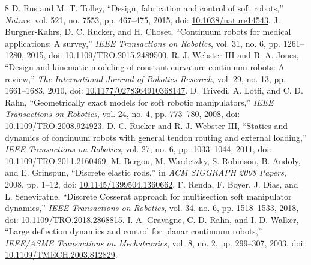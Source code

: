 \documentclass[letterpaper,10pt,conference]{ieeeconf}
\begin{document}
\clearpage
\begin{thebibliography}{8}
D. Rus and M. T. Tolley, ``Design, fabrication and control of soft robots,''
\emph{Nature}, vol. 521, no. 7553, pp. 467--475, 2015,
doi: \href{https://doi.org/10.1038/nature14543}{10.1038/nature14543}.
J. Burgner-Kahrs, D. C. Rucker, and H. Choset,
``Continuum robots for medical applications: A survey,''
\emph{IEEE Transactions on Robotics}, vol. 31, no. 6,
pp. 1261--1280, 2015,
doi: \href{https://doi.org/10.1109/TRO.2015.2489500}{10.1109/TRO.2015.2489500}.
R. J. Webster III and B. A. Jones,
``Design and kinematic modeling of constant curvature continuum robots:
A review,'' \emph{The International Journal of Robotics Research},
vol. 29, no. 13, pp. 1661--1683, 2010,
doi: \href{https://doi.org/10.1177/0278364910368147}{10.1177/0278364910368147}.
D. Trivedi, A. Lotfi, and C. D. Rahn,
``Geometrically exact models for soft robotic manipulators,''
\emph{IEEE Transactions on Robotics}, vol. 24, no. 4,
pp. 773--780, 2008,
doi: \href{https://doi.org/10.1109/TRO.2008.924923}{10.1109/TRO.2008.924923}.
D. C. Rucker and R. J. Webster III,
``Statics and dynamics of continuum robots with general tendon routing
and external loading,'' \emph{IEEE Transactions on Robotics},
vol. 27, no. 6, pp. 1033--1044, 2011,
doi: \href{https://doi.org/10.1109/TRO.2011.2160469}{10.1109/TRO.2011.2160469}.
M. Bergou, M. Wardetzky, S. Robinson, B. Audoly, and E. Grinspun,
``Discrete elastic rods,'' in \emph{ACM SIGGRAPH 2008 Papers},
2008, pp. 1--12,
doi: \href{https://doi.org/10.1145/1399504.1360662}{10.1145/1399504.1360662}.
F. Renda, F. Boyer, J. Dias, and L. Seneviratne,
``Discrete Cosserat approach for multisection soft manipulator dynamics,''
\emph{IEEE Transactions on Robotics}, vol. 34, no. 6,
pp. 1518--1533, 2018,
doi: \href{https://doi.org/10.1109/TRO.2018.2868815}{10.1109/TRO.2018.2868815}.
I. A. Gravagne, C. D. Rahn, and I. D. Walker,
``Large deflection dynamics and control for planar continuum robots,''
\emph{IEEE/ASME Transactions on Mechatronics}, vol. 8, no. 2,
pp. 299--307, 2003,
doi: \href{https://doi.org/10.1109/TMECH.2003.812829}{10.1109/TMECH.2003.812829}.
\end{thebibliography}
\end{document}
